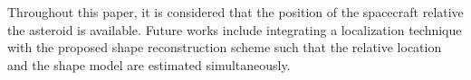 \documentclass[journal]{new-aiaa}
\begin{document}
Throughout this paper, it is considered that the position of the spacecraft relative the asteroid is available. 
Future works include integrating a localization technique with the proposed shape reconstruction scheme such that the relative location and the shape model are estimated simultaneously.



\end{document}
